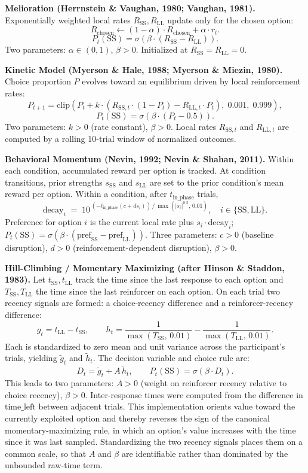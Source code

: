 \documentclass[12pt]{article}
\begin{document}
\textbf{Melioration (Herrnstein \& Vaughan, 1980; Vaughan, 1981).} Exponentially weighted local rates $R_{\mathrm{SS}}, R_{\mathrm{LL}}$ update only for the chosen option:
\[
R_{\text{chosen}} \leftarrow (1 - \alpha) \cdot R_{\text{chosen}} + \alpha \cdot r_t.
\]
\[
P_t(\mathrm{SS}) = \sigma\!\left( \beta \cdot (R_{\mathrm{SS}} - R_{\mathrm{LL}}) \right).
\]
Two parameters: $\alpha \in (0, 1)$, $\beta > 0$. Initialized at $R_{\mathrm{SS}} = R_{\mathrm{LL}} = 0$.

\textbf{Kinetic Model (Myerson \& Hale, 1988; Myerson \& Miezin, 1980).} Choice proportion $P$ evolves toward an equilibrium driven by local reinforcement rates:
\[
P_{t+1} = \mathrm{clip}\!\left( P_t + k \cdot \left( R_{\mathrm{SS}, t} \cdot (1 - P_t) - R_{\mathrm{LL}, t} \cdot P_t \right),\; 0.001,\; 0.999 \right),
\]
\[
P_t(\mathrm{SS}) = \sigma\!\left( \beta \cdot (P_t - 0.5) \right).
\]
Two parameters: $k > 0$ (rate constant), $\beta > 0$. Local rates $R_{\mathrm{SS}, t}$ and $R_{\mathrm{LL}, t}$ are computed by a rolling 10-trial window of normalized outcomes.

\textbf{Behavioral Momentum (Nevin, 1992; Nevin \& Shahan, 2011).} Within each condition, accumulated reward per option is tracked. At condition transitions, prior strengths $s_{\mathrm{SS}}$ and $s_{\mathrm{LL}}$ are set to the prior condition's mean reward per option. Within a condition, after $t_{\text{in\_phase}}$ trials,
\[
\mathrm{decay}_i \;=\; 10^{\,(-t_{\text{in\_phase}} (c + d s_i)) \,/\, \max(|s_i|^{0.5},\, 0.01)}, \quad i \in \{\mathrm{SS}, \mathrm{LL}\}.
\]
Preference for option $i$ is the current local rate plus $s_i \cdot \mathrm{decay}_i$; $P_t(\mathrm{SS}) = \sigma\!\left( \beta \cdot (\mathrm{pref}_{\mathrm{SS}} - \mathrm{pref}_{\mathrm{LL}}) \right)$. Three parameters: $c > 0$ (baseline disruption), $d > 0$ (reinforcement-dependent disruption), $\beta > 0$.

\textbf{Hill-Climbing / Momentary Maximizing (after Hinson \& Staddon, 1983).} Let $t_{\mathrm{SS}}, t_{\mathrm{LL}}$ track the time since the last response to each option and $T_{\mathrm{SS}}, T_{\mathrm{LL}}$ the time since the last reinforcer on each option. On each trial two recency signals are formed: a choice-recency difference and a reinforcer-recency difference:
\[
g_t = t_{\mathrm{LL}} - t_{\mathrm{SS}}, \qquad
h_t = \frac{1}{\max(T_{\mathrm{SS}},\, 0.01)} - \frac{1}{\max(T_{\mathrm{LL}},\, 0.01)}.
\]
Each is standardized to zero mean and unit variance across the participant's trials, yielding $\tilde{g}_t$ and $\tilde{h}_t$. The decision variable and choice rule are:
\[
D_t = \tilde{g}_t + A\,\tilde{h}_t, \qquad
P_t(\mathrm{SS}) = \sigma\!\left( \beta \cdot D_t \right).
\]
This leads to two parameters: $A > 0$ (weight on reinforcer recency relative to choice recency), $\beta > 0$. Inter-response times were computed from the difference in $\mathrm{time\_left}$ between adjacent trials. This implementation orients value toward the currently exploited option and thereby reverses the sign of the canonical momentary-maximizing rule, in which an option's value increases with the time since it was last sampled. Standardizing the two recency signals places them on a common scale, so that $A$ and $\beta$ are identifiable rather than dominated by the unbounded raw-time term.
\end{document}
